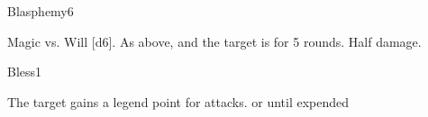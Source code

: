 \begin{spellsection}{Blasphemy}{6}
    \begin{spellheader}
    \end{spellheader}
    \begin{spellcontent}
        \begin{spelltargetinginfo}
        \end{spelltargetinginfo}
        \begin{spelleffects}
            \begin{spellattack}{Magic vs. Will}
                \spellsuccess {}[d6].
                \spellcritical As above, and the target is \staggered for 5 rounds.
                \spellfailure Half damage.
            \end{spellattack}
        \end{spelleffects}
    \end{spellcontent}
    \begin{spellfooter}
        \miscastexplode
    \end{spellfooter}
\end{spellsection}

\begin{spellsection}{Bless}{1}
    \begin{spellheader}
    \end{spellheader}
    \begin{spellcontent}
        \begin{spelltargetinginfo}
        \end{spelltargetinginfo}
        \begin{spelleffects}
            \spelleffect The target gains a legend point for attacks.
            \spelldur \durshort or until expended
        \end{spelleffects}
    \end{spellcontent}
    \begin{spellfooter}
        \miscastrandom
    \end{spellfooter}
\end{spellsection}

